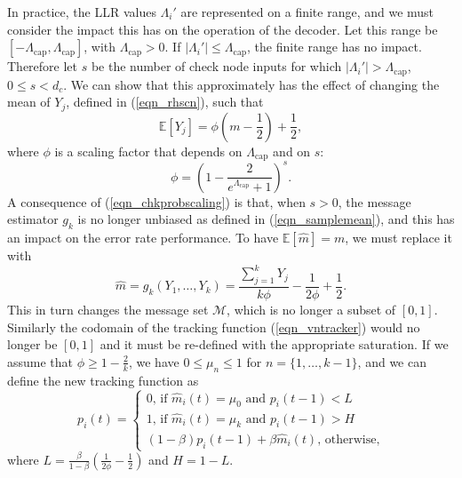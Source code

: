 \documentclass[12pt,journal,twoside,draftcls,onecolumn]{IEEEtran}
\newcommand{\E}{\mathbb{E}}
\begin{document}
	In practice, the LLR values $\Lambda_{i}'$ are represented on a finite range, and we must consider the impact this has on the operation of the decoder. Let this range be $[-\Lambda_\mathrm{cap}, \Lambda_\mathrm{cap}]$, with $\Lambda_\mathrm{cap} > 0$. If $|\Lambda_{i}'| \leq \Lambda_\mathrm{cap}$, the finite range has no impact. Therefore let $s$ be the number of check node inputs for which $|\Lambda_{i}'| > \Lambda_\mathrm{cap}$, $0 \leq s < d_c$. We can show that this approximately has the effect of changing the mean of $Y_j$, defined in (\ref{eqn_rhscn}), such that
	\begin{equation}
	\label{eqn_chkprobscaling}
	\E[Y_j] = \phi (m - \frac{1}{2}) + \frac{1}{2},
	\end{equation}
	where $\phi$ is a scaling factor that depends on $\Lambda_\mathrm{cap}$ and on $s$:
	\begin{equation}
	\label{eqn_phi}
	\phi = \left( 1 - \frac{2}{e^{\Lambda_\mathrm{cap}}+1} \right)^{s}.
	\end{equation}
	A consequence of (\ref{eqn_chkprobscaling}) is that, when $s>0$, the message estimator $g_k$ is no longer unbiased as defined in (\ref{eqn_samplemean}), and this has an impact on the error rate performance. To have $\E[\hat{m}]=m$, we must replace it with
	\begin{equation}
	\label{eqn_msgestimator2}
	\hat{m} = g_k(Y_1, \ldots, Y_k) = \frac{\sum_{j=1}^{k} Y_j}{k\phi} - \frac{1}{2\phi} + \frac{1}{2}.
	\end{equation}
	This in turn changes the message set $\mathcal{M}$, which is no longer a subset of $[0, 1]$. Similarly the codomain of the tracking function (\ref{eqn_vntracker}) would no longer be $[0,1]$ and it must be re-defined with the appropriate saturation. If we assume that $\phi \geq 1 - \frac{2}{k}$, we have $0 \leq \mu_n \leq 1$ for $n=\{1, \ldots, k-1\}$, and we can define the new tracking function as
	\begin{equation}
	\label{eqn_probtracker2}
	p_i(t) =
		\begin{cases}
		0 \text{, if $\hat{m}_i(t) = \mu_0$ and $p_i(t-1) < L$} \\
		1 \text{, if $\hat{m}_i(t) = \mu_{k}$ and $p_i(t-1) > H$} \\
		(1 - \beta) p_i(t-1) + \beta \hat{m}_i(t) \text{, otherwise,}
		\end{cases}
	\end{equation}
	where $L = \frac{\beta}{1 - \beta} \left( \frac{1}{2\phi} - \frac{1}{2} \right)$ and $H = 1 - L$.
	
\end{document}

